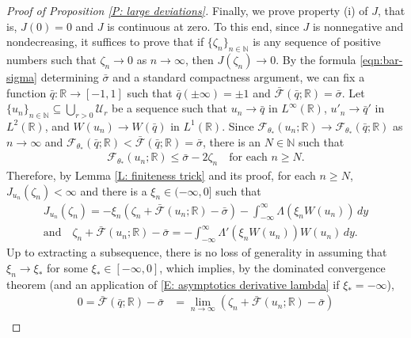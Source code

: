 \documentclass[10pt,a4paper]{amsart}
\begin{document}
\begin{proof}[Proof of Proposition \ref{P: large deviations}]
        	
        Finally, we prove property (i) of $J$, that is, $J(0) = 0$ and $J$ is continuous at zero.  To this end, since $J$ is nonnegative and nondecreasing, it suffices to prove that if $\{\zeta_{n}\}_{n \in \mathbb{N}}$ is any sequence of positive numbers such that $\zeta_{n} \to 0$ as $n \to \infty$, then $J(\zeta_{n}) \to 0$. By the formula \eqref{eqn:bar-sigma} determining $\bar{\sigma}$ and a standard compactness argument, we can fix a function $\bar{q} : \mathbb{R} \to [-1,1]$ such that $\bar{q}(\pm \infty) = \pm 1$ and $\bar{\mathscr{F}}(\bar{q};\mathbb{R}) = \bar{\sigma}$.  Let $\{u_{n}\}_{n \in \mathbb{N}} \subseteq \bigcup_{r > 0} \mathcal{U}_{r}$ be a sequence such that $u_{n} \to \bar{q}$ in $L^{\infty}(\mathbb{R})$, $u'_{n} \to \bar{q}'$ in $L^{2}(\mathbb{R})$, and $W(u_{n}) \to W(\bar{q})$ in $L^{1}(\mathbb{R})$.  Since $\mathscr{F}_{\theta_{*}}(u_{n};\mathbb{R}) \to \mathscr{F}_{\theta_{*}}(\bar{q};\mathbb{R})$ as $n \to \infty$ and $\mathscr{F}_{\theta_{*}}(\bar{q};\mathbb{R}) < \bar{\mathscr{F}}(\bar{q};\mathbb{R}) = \bar{\sigma}$, there is an $N \in \mathbb{N}$ such that 
            \begin{align*}
                \mathscr{F}_{\theta_{*}}(u_{n};\mathbb{R}) \leq \bar{\sigma} - 2\zeta_{n} \quad \text{for each} \, \, n \geq N. 
            \end{align*}
        Therefore, by Lemma \ref{L: finiteness trick} and its proof, for each $n \geq N$, $J_{u_{n}}(\zeta_{n}) < \infty$ and there is a $\xi_{n} \in (-\infty,0]$ such that 
        	\begin{align}
		J_{u_{n}}(\zeta_{n}) = - \xi_{n} ( \zeta_{n} + \bar{\mathscr{F}}(u_{n}; \mathbb{R}) - \bar{\sigma} ) - \int_{-\infty}^{\infty} \Lambda ( \xi_{n} W(u_{n}) ) \, dy  \label{E: analyze J at zero} \\
		\text{and} \quad \zeta_{n} + \bar{\mathscr{F}}(u_{n};\mathbb{R}) - \bar{\sigma} = - \int_{-\infty}^{\infty} \Lambda'( \xi_{n} W(u_{n}) ) W(u_{n}) \, dy. \nonumber
	\end{align}
Up to extracting a subsequence, there is no loss of generality in assuming that $\xi_{n} \to \xi_{*}$ for some $\xi_{*} \in [-\infty,0]$, which implies, by the dominated convergence theorem (and an application of \eqref{E: asymptotics derivative lambda} if $ \xi_* = - \infty $),
	\begin{align*}
		0 = \bar{\mathscr{F}}(\bar{q}; \mathbb{R}) - \bar{\sigma} &= \lim_{n \to \infty} \left( \zeta_{n} + \bar{\mathscr{F}}(u_{n};\mathbb{R}) - \bar{\sigma} \right) \\

\end{align*}
\end{proof}
\end{document}
